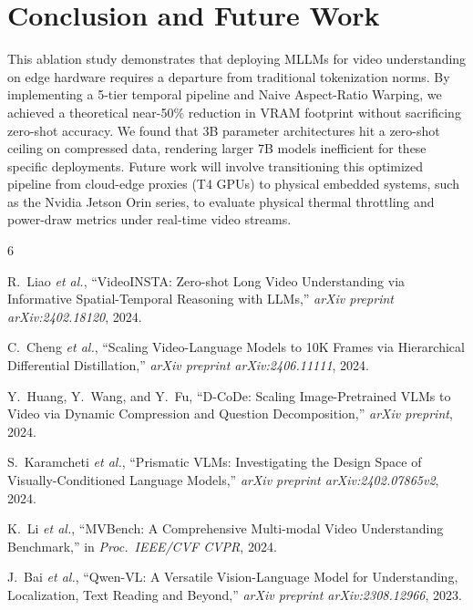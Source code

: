 \documentclass[conference]{IEEEtran}
\begin{document}
\section{Conclusion and Future Work}
This ablation study demonstrates that deploying MLLMs for video understanding
on edge hardware requires a departure from traditional tokenization norms.
By implementing a 5-tier temporal pipeline and Naive Aspect-Ratio Warping,
we achieved a theoretical near-50\% reduction in VRAM footprint without
sacrificing zero-shot accuracy.
We found that 3B parameter architectures hit a zero-shot ceiling on
compressed data, rendering larger 7B models inefficient for these specific
deployments.
Future work will involve transitioning this optimized pipeline from cloud-edge
proxies (T4 GPUs) to physical embedded systems, such as the Nvidia Jetson
Orin series, to evaluate physical thermal throttling and power-draw metrics
under real-time video streams.

\begin{thebibliography}{6}

R.~Liao \emph{et al.}, ``VideoINSTA: Zero-shot Long Video Understanding via
Informative Spatial-Temporal Reasoning with LLMs,''
\emph{arXiv preprint arXiv:2402.18120}, 2024.

C.~Cheng \emph{et al.}, ``Scaling Video-Language Models to 10K Frames via
Hierarchical Differential Distillation,''
\emph{arXiv preprint arXiv:2406.11111}, 2024.

Y.~Huang, Y.~Wang, and Y.~Fu, ``D-CoDe: Scaling Image-Pretrained VLMs to
Video via Dynamic Compression and Question Decomposition,''
\emph{arXiv preprint}, 2024.

S.~Karamcheti \emph{et al.}, ``Prismatic VLMs: Investigating the Design Space
of Visually-Conditioned Language Models,''
\emph{arXiv preprint arXiv:2402.07865v2}, 2024.

K.~Li \emph{et al.}, ``MVBench: A Comprehensive Multi-modal Video
Understanding Benchmark,'' in \emph{Proc.\ IEEE/CVF CVPR}, 2024.

J.~Bai \emph{et al.}, ``Qwen-VL: A Versatile Vision-Language Model for
Understanding, Localization, Text Reading and Beyond,''
\emph{arXiv preprint arXiv:2308.12966}, 2023.

\end{thebibliography}
\end{document}
